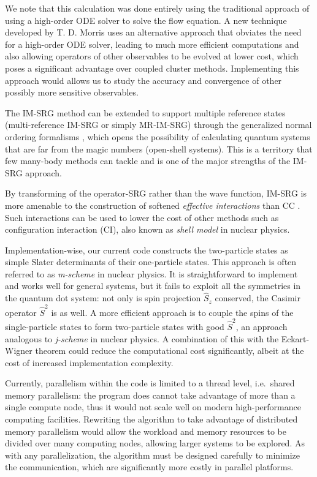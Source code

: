 We note that this calculation was done entirely using the traditional approach of using a high-order ODE solver to solve the flow equation.  A new technique developed by T. D. Morris \cite{PhysRevC.92.034331} uses an alternative approach that obviates the need for a high-order ODE solver, leading to much more efficient computations and also allowing operators of other observables to be evolved at lower cost, which poses a significant advantage over coupled cluster methods.  Implementing this approach would allows us to study the accuracy and convergence of other possibly more sensitive observables.

The IM-SRG method can be extended to support multiple reference states (multi-reference IM-SRG or simply MR-IM-SRG) \cite{PhysRevLett.110.242501,PhysRevC.90.041302} through the generalized normal ordering formalisms \cite{doi:10.1063/1.474405}, which opens the possibility of calculating quantum systems that are far from the magic numbers (open-shell systems).  This is a territory that few many-body methods can tackle and is one of the major strengths of the IM-SRG approach.

By transforming of the operator-SRG rather than the wave function, IM-SRG is more amenable to the construction of softened \textit{effective interactions} than CC \cite{Hergert2016165}.  Such interactions can be used to lower the cost of other methods such as configuration interaction (CI), also known as \textit{shell model} in nuclear physics.

Implementation-wise, our current code constructs the two-particle states as simple Slater determinants of their one-particle states.  This approach is often referred to as \textit{m-scheme} in nuclear physics.  It is straightforward to implement and works well for general systems, but it fails to exploit all the symmetries in the quantum dot system: not only is spin projection $\hat S_z$ conserved, the Casimir operator $\hat S^2$ is as well.  A more efficient approach is to couple the spins of the single-particle states to form two-particle states with good $\hat S^2$, an approach analogous to \textit{j-scheme} in nuclear physics.  A combination of this with the Eckart-Wigner theorem could reduce the computational cost significantly, albeit at the cost of increased implementation complexity.

Currently, parallelism within the code is limited to a thread level, i.e.\ shared memory parallelism: the program does cannot take advantage of more than a single compute node, thus it would not scale well on modern high-performance computing facilities.  Rewriting the algorithm to take advantage of distributed memory parallelism would allow the workload and memory resources to be divided over many computing nodes, allowing larger systems to be explored.  As with any parallelization, the algorithm must be designed carefully to minimize the communication, which are significantly more costly in parallel platforms.

